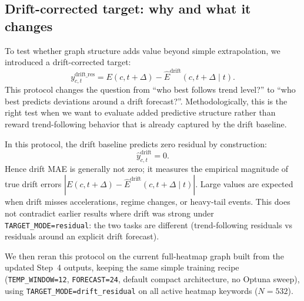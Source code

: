 \documentclass{article}
\begin{document}
\subsection{Drift-corrected target: why and what it changes}
To test whether graph structure adds value beyond simple extrapolation, we introduced a
drift-corrected target:
\[
y^{\text{drift\_res}}_{c,t}
=
E(c,t+\Delta)-\widehat{E}^{\text{drift}}(c,t+\Delta \mid t).
\]
This protocol changes the question from ``who best follows trend level?'' to
``who best predicts deviations around a drift forecast?''.
Methodologically, this is the right test when we want to evaluate added predictive structure rather
than reward trend-following behavior that is already captured by the drift baseline.

In this protocol, the drift baseline predicts zero residual by construction:
\[
\hat{y}^{\text{drift}}_{c,t}=0.
\]
Hence drift MAE is generally not zero; it measures the empirical magnitude of true drift errors
$|E(c,t+\Delta)-\widehat{E}^{\text{drift}}(c,t+\Delta\mid t)|$.
Large values are expected when drift misses accelerations, regime changes, or heavy-tail events.
This does not contradict earlier results where drift was strong under \texttt{TARGET\_MODE=residual}:
the two tasks are different (trend-following residuals vs residuals around an explicit drift forecast).

We then reran this protocol on the current full-heatmap graph built from the updated Step~4 outputs,
keeping the same simple training recipe
(\texttt{TEMP\_WINDOW=12}, \texttt{FORECAST=24}, default compact architecture, no Optuna sweep), using
\texttt{TARGET\_MODE=drift\_residual} on all active heatmap keywords (\(N=532\)).

\begin{table}[htbp]
\centering
\caption{Evaluation results under \texttt{TARGET\_MODE=drift\_residual} on the full heatmap.}
\label{tab:drift_residual_comparison}
\end{table}
\end{document}
